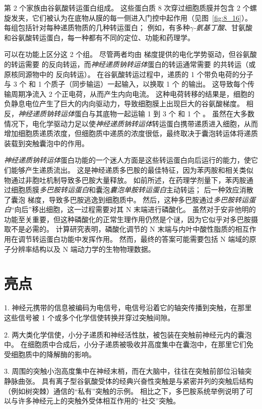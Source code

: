 第 2 个家族由谷氨酸转运蛋白组成。
这些蛋白质 8 次穿过细胞质膜并包含 2 个螺旋发夹，它们被认为在底物从膜的每一侧进入门控中起作用（见图~\ref{fig:8_16}）。
每组包括针对每种递质物质的几种转运蛋白；
例如，有多种\textit{$\gamma$-氨基丁酸}、甘氨酸和谷氨酸转运蛋白，每一种都有不同的定位、功能和药理学。


可以在功能上区分这 2 个组。
尽管两者均由  梯度提供的电化学势驱动，但谷氨酸的转运需要  的反向转运，而\textit{神经递质钠转运体}蛋白的转运通常需要  的共转运（或原核同源物中的  反向转运）。
在谷氨酸转运过程中，递质的 1 个带负电荷的分子与 3 个  和 1 个质子（同步输运）一起输入，以换取 1 个  的输出。
这导致每个传输周期净流入 2 个正电荷，从而产生内向电流。
这种电荷转移的结果是，细胞的负静息电位产生了巨大的内向驱动力，导致细胞膜上出现巨大的谷氨酸梯度。
相反，\textit{神经递质钠转运体}蛋白与其底物一起运输 1 到 3 个  和 1 个 。
虽然在大多数情况下，电化学驱动力足以使\textit{神经递质钠转运体}转运蛋白携带递质进入细胞，从而增加细胞质递质浓度，但细胞质中递质的浓度很低，最终取决于囊泡转运体将递质装载到突触囊泡中的作用。


\textit{神经递质钠转运体}蛋白功能的一个迷人方面是这些转运蛋白向后运行的能力，使它们能够产生递质流出。
这是神经递质多巴胺的最佳特征，因为苯丙胺和相关类似物通过非胞吐机制导致多巴胺大量释放。
如前所述，在药理学剂量下，苯丙胺通过细胞质膜\textit{多巴胺转运蛋白}和囊泡\textit{囊泡单胺转运蛋白}主动转运；
后一种效应消散了囊泡  梯度，导致多巴胺逃逸到细胞质中。
然后，这种多巴胺通过\textit{多巴胺转运蛋白}“向后”移出细胞，这一过程需要对其 N 末端进行磷酸化。
虽然对于安非他明的功能至关重要，但这种磷酸化的正常生理作用仍然是个谜，因为它似乎对多巴胺摄取不是必需的。
计算研究表明，磷酸化调节的 N 末端与内叶中酸性脂质的相互作用在调节转运蛋白功能中发挥作用。
然而，最终的答案可能需要包括 N 端域的原子分辨率结构以及 N 端动力学的生物物理数据。



\section{亮点}

1. 神经元携带的信息被编码为电信号，电信号沿着它的轴突传播到突触，在那里这些信号被 1 个或多个化学信使转换并穿过突触间隙。


2. 两大类化学信使，小分子递质和神经活性肽，被包装在突触前神经元内的囊泡中。
在细胞质中合成后，小分子递质被吸收并高度集中在囊泡中，在那里它们免受细胞质中的降解酶的影响。


3. 周围的突触小泡高度集中在神经末梢，而在大脑中，往往在突触前部位沿轴突静脉曲张。
具有离子型谷氨酸受体的经典兴奋性突触是与紧密并列的突触后结构（例如树突棘）通信的“私有”突触的示例。
相比之下，多巴胺系统举例说明了可以与许多神经元上的突触外受体相互作用的“社交”突触。


